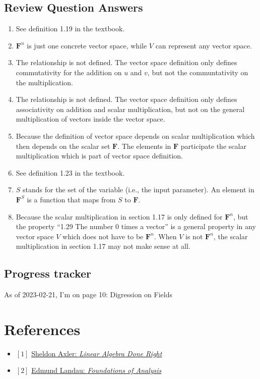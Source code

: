 \documentclass[12pt, letterpaper, oneside]{book}
\begin{document}
\section*{Review Question Answers}

\begin{enumerate}
  \item See definition 1.19 in the textbook.
  \item $\mathbf{F}^n$ is just one concrete vector space, while $V$ can
    represent any vector space.
  \item The relationship is not defined. The vector space definition only
    defines commutativity for the addition on $u$ and $v$, but not the
    communtativity on the multiplication.
  \item The relationship is not defined. The vector space definition only
    defines associativity on addition and scalar multiplication, but not on
    the general multiplication of vectors inside the vector space.
  \item Because the definition of vector space depends on scalar multiplication
    which then depends on the scalar set $\mathbf{F}$. The elements in
    $\mathbf{F}$ participate the scalar multiplication which is part of vector
    space definition.
  \item See definition 1.23 in the textbook.
  \item $S$ stands for the set of the variable (i.e., the input parameter). An
    element in $\mathbf{F}^S$ is a function that maps from $S$ to $\mathbf{F}$.
  \item Because the scalar multiplication in section 1.17 is only defined for
    $\mathbf{F}^n$, but the property ``1.29 The number 0 times a vector'' is a
    general property in any vector space $V$ which does not have to be
    $\mathbf{F}^n$. When $V$ is not $\mathbf{F}^n$, the scalar multiplication
    in section 1.17 may not make sense at all.
 \end{enumerate}

\section*{Progress tracker}

As of 2023-02-21, I'm on page 10: Digression on Fields

\chapter*{References}

\begin{itemize}
  \item $[1]$ \href{https://linear.axler.net/}{Sheldon Axler: \it{Linear Algebra Done Right}}
  \item $[2]$ \href{https://bookstore.ams.org/view?ProductCode=CHEL/79}{Edmund Landau: \it{Foundations of Analysis}}
\end{itemize}
\end{document}
